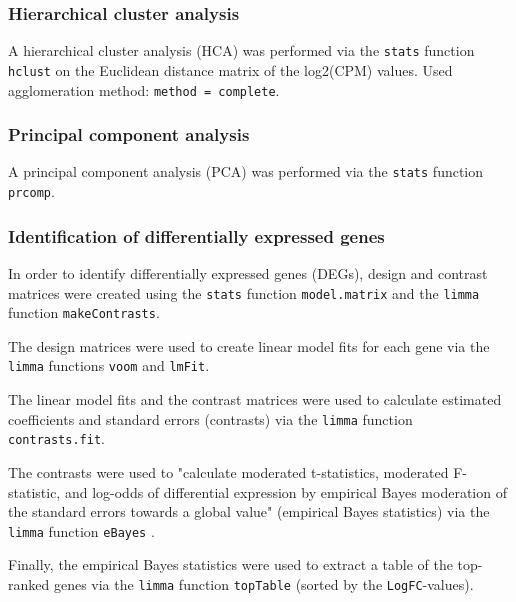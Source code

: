 \subsubsection{Hierarchical cluster analysis}

A hierarchical cluster analysis (HCA) was performed via the \verb|stats| function \verb|hclust| on the Euclidean distance matrix of the log2(CPM) values. Used agglomeration method: \verb|method = complete|.

\subsubsection{Principal component analysis}

A principal component analysis (PCA) was performed via the \verb|stats| function \verb|prcomp|.

\subsubsection{Identification of differentially expressed genes}

In order to identify differentially expressed genes (DEGs), design and contrast matrices were created using the \verb|stats| function \verb|model.matrix| and the \verb|limma| function \verb|makeContrasts|.

The design matrices were used to create linear model fits for each gene via the \verb|limma| functions \verb|voom| and \verb|lmFit|.

The linear model fits and the contrast matrices were used to calculate estimated coefficients and standard errors (contrasts) via the \verb|limma| function \verb|contrasts.fit|.

The contrasts were used to "calculate moderated t-statistics, moderated F-statistic, and log-odds of differential expression by empirical Bayes moderation of the standard errors towards a global value" (empirical Bayes statistics) via the \verb|limma| function \verb|eBayes| \autocite{R-limma}.

Finally, the empirical Bayes statistics were used to extract a table of the top-ranked genes via the \verb|limma| function \verb|topTable| (sorted by the \verb|LogFC|-values).

